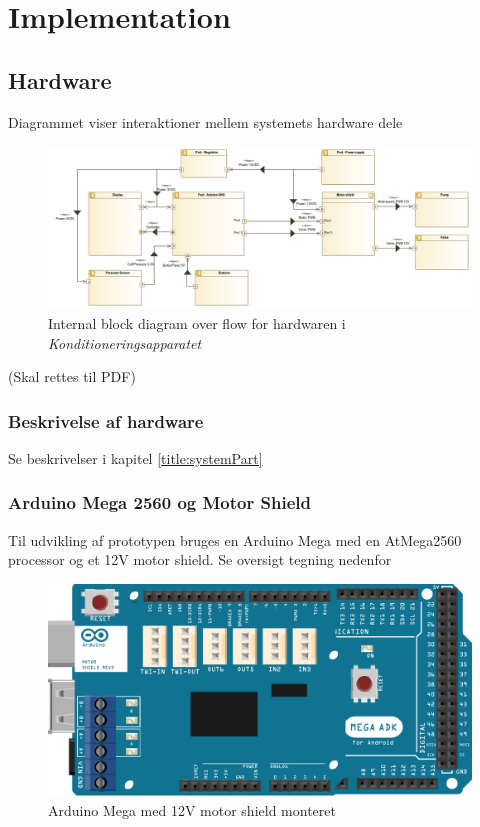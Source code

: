 \section{Implementation}

\subsection{Hardware}
Diagrammet viser interaktioner mellem systemets hardware dele \\
\begin{figure}[H]
	\includegraphics[width=\textwidth]{pdfs/InternalBlockdiagram(Hardware).png}
	\caption{Internal block diagram over flow for hardwaren i \textit{Konditioneringsapparatet}}
\end{figure}
(Skal rettes til PDF)

\subsubsection{Beskrivelse af hardware}
Se beskrivelser i kapitel \ref{title:systemPart}

\subsubsection{Arduino Mega 2560 og Motor Shield}
Til udvikling af prototypen bruges en Arduino Mega med en AtMega2560 processor og et 12V motor shield. Se oversigt tegning nedenfor \\
\begin{figure}[H]
	\includegraphics[width=\textwidth]{pdfs/MegaPlusShield-crop.pdf}
	\caption{Arduino Mega med 12V motor shield monteret}
\end{figure}


